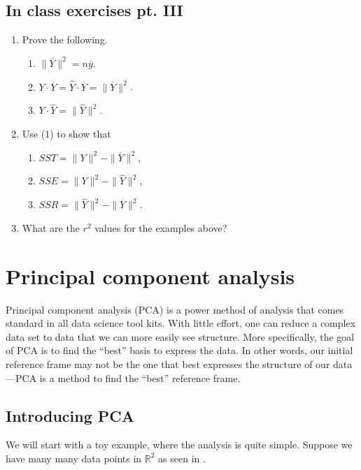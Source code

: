 \documentclass[a4paper, 12pt]{article}
\numberwithin{equation}{section}
\numberwithin{figure}{section}
\theoremstyle{definition}
\newcommand{\R}{\mathbb{R}}
\begin{document}
\subsection{In class exercises pt. III}

\begin{enumerate}
	\item Prove the following.
	\begin{enumerate}
		\item $\| \overline{Y} \|^2 = n\overline{y}$.
		\item $Y \cdot \overline{Y} = \widehat{Y}\cdot \overline{Y} = \| \overline{Y} \|^2$.
		\item $Y\cdot \widehat{Y} = \| \widehat{Y} \|^2$.
	\end{enumerate}
	\item Use (1) to show that 
	\begin{enumerate}
		\item $SST = \|Y\|^2 - \|\overline{Y}\|^2$,
		\item $SSE = \|Y\|^2 - \| \widehat{Y} \|^2$,
		\item $SSR = \| \widehat{Y} \|^2 - \| \overline{Y} \|^2$.
	\end{enumerate}
	\item What are the $r^2$ values for the examples above?
\end{enumerate}



\section{Principal component analysis}

Principal component analysis (PCA) is a power method of analysis that comes
standard in all data science tool kits. With little effort, one can reduce a
complex data set to data that we can more easily see structure. More
specifically, the goal of PCA is to find the ``best'' basis to express the data.
In other words, our initial reference frame may not be the one that best
expresses the structure of our data---PCA is a method to find the ``best''
reference frame.

\subsection{Introducing PCA}

We will start with a toy example, where the analysis is quite simple. Suppose we
have many many data points in $\R^2$ as seen in .
\end{document}
